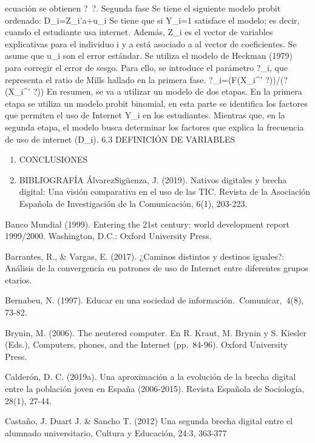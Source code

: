 ecuación se obtienen ?~?. Segunda fase Se tiene el siguiente modelo
probit ordenado: D\_i=Z\_i'a+u\_i Se tiene que si Y\_i=1 satisface el
modelo; es decir, cuando el estudiante usa internet. Además, Z\_i es el
vector de variables explicativas para el individuo i y a está asociado a
al vector de coeficientes. Se asume que u\_i son el error estándar. Se
utiliza el modelo de Heckman (1979) para corregir el error de sesgo.
Para ello, se introduce el parámetro ?\_i, que representa el ratio de
Mills hallado en la primera fase. ?\_i=(F(X\_i\^{}' ?))/(?(X\_i\^{}' ?))
En resumen, se va a utilizar un modelo de dos etapas. En la primera
etapa se utiliza un modelo probit binomial, en esta parte se identifica
los factores que permiten el uso de Internet Y\_i en los estudiantes.
Mientras que, en la segunda etapa, el modelo busca determinar los
factores que explica la frecuencia de uso de internet (D\_i). 6.3
DEFINICIÓN DE VARIABLES

\begin{enumerate}
\def\labelenumi{\arabic{enumi}.}
\setcounter{enumi}{6}
\item
  CONCLUSIONES
\item
  BIBLIOGRAFÍA ÁlvarezSigüenza, J. (2019). Nativos digitales y brecha
  digital: Una visión comparativa en el uso de las TIC. Revista de la
  Asociación Española de Investigación de la Comunicación, 6(1),
  203-223.
\end{enumerate}

Banco Mundial (1999). Entering the 21st century: world development
report 1999/2000. Washington, D.C.: Oxford University Press.

Barrantes, R., \& Vargas, E. (2017). ¿Caminos distintos y destinos
iguales?: Análisis de la convergencia en patrones de uso de Internet
entre diferentes grupos etarios.

Bernabeu, N. (1997). Educar en una sociedad de
información.~Comunicar,~4(8), 73-82.

Brynin, M. (2006). The neutered computer. En R. Kraut, M. Brynin y S.
Kiesler (Eds.), Computers, phones, and the Internet (pp.~84-96). Oxford
University Press.

Calderón, D. C. (2019a). Una aproximación a la evolución de la brecha
digital entre la población joven en España (2006-2015). Revista Española
de Sociología, 28(1), 27-44.

Castaño, J. Duart J. \& Sancho T. (2012) Una segunda brecha digital
entre el alumnado universitario, Cultura y Educación, 24:3, 363-377


